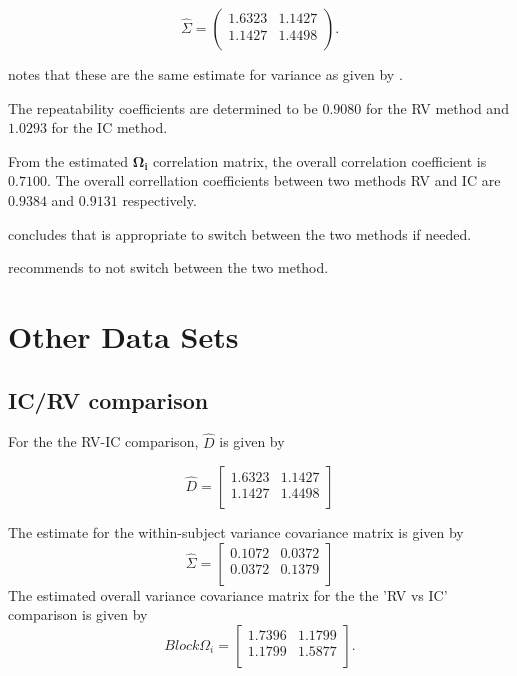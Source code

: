 \documentclass[12pt, a4paper]{report}
\theoremstyle{plain}
\theoremstyle{definition}
\theoremstyle{remark}
\begin{document}
	
	
	\begin{equation}\hat{\Sigma}=\left(
	\begin{array}{cc}
	1.6323 & 1.1427 \\
	1.1427 & 1.4498 \\
	\end{array}
	\right).
	\end{equation}
	
	\citet{ARoy2009} notes that these are the same estimate for variance as given by \citet{BA99}.
	
	
	The repeatability coefficients are determined to be $0.9080$ for the RV method and $1.0293$ for the IC method.
	
	From the estimated $\boldsymbol{\Omega_{i}}$ correlation matrix, the overall correlation coefficient is $0.7100$.
	The overall correllation coefficients between two methods RV and IC are $0.9384$ and $0.9131$ respectively.
	
\citet{ARoy2009} concludes that is appropriate to switch between the two methods if needed.
	

	
\citet{ARoy2009} recommends to not switch between the two method.
	

	
\chapter{Other Data Sets}
\section{IC/RV comparison}
		
For the the RV-IC comparison, $\hat{D}$ is given by


\begin{equation}
\hat{D}= \left[ \begin{array}{cc}
1.6323 & 1.1427  \\
1.1427 & 1.4498 \\
\end{array} \right]
\end{equation}

The estimate for the within-subject variance covariance matrix is
given by
\begin{equation}
\hat{\Sigma}= \left[ \begin{array}{cc}
0.1072 & 0.0372  \\
0.0372 & 0.1379  \\
\end{array}\right]
\end{equation}
The estimated overall variance covariance matrix for the the 'RV
vs IC' comparison is given by
\begin{equation}
Block \Omega_{i}= \left[ \begin{array}{cc}
1.7396 & 1.1799  \\
1.1799 & 1.5877  \\
\end{array} \right].
\end{equation}
\end{document}
